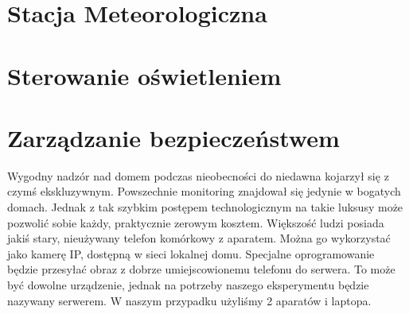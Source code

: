 \documentclass[brudnopis]{xmgr}
\begin{document}
\section{Stacja Meteorologiczna}


\section{Sterowanie oświetleniem}

\section{Zarządzanie bezpieczeństwem}
Wygodny nadzór nad domem podczas nieobecności do niedawna kojarzył się z czymś ekskluzywnym. Powszechnie monitoring znajdował się jedynie w bogatych domach. Jednak z tak szybkim postępem technologicznym na takie luksusy może pozwolić sobie każdy, praktycznie zerowym kosztem. Większość ludzi posiada jakiś stary, nieużywany telefon komórkowy z aparatem. Można go wykorzystać jako kamerę IP, dostępną w sieci lokalnej domu. Specjalne oprogramowanie będzie przesyłać obraz z dobrze umiejscowionemu telefonu do serwera. To może być dowolne urządzenie, jednak na potrzeby naszego eksperymentu będzie nazywany serwerem. W naszym przypadku użyliśmy 2 aparatów i laptopa. 
\end{document}
